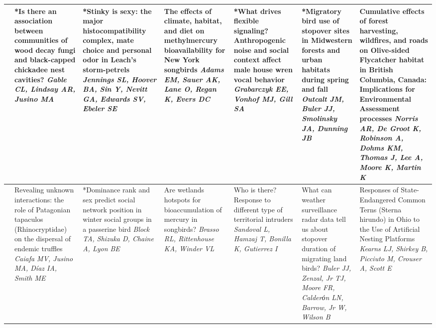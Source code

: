 \begin{tabular}{|x{0.75cm}|a{2.25cm}|x{2.25cm}|x{2.25cm}|x{2.25cm}|x{2.25cm}|x{2.25cm}|}
&*Is there an association between communities of wood decay fungi and black-capped chickadee nest cavities? \newline \newline \textit{Gable CL, Lindsay AR, Jusino MA} & *Stinky is sexy: the major histocompatibility complex, mate choice and personal odor in Leach’s storm-petrels \newline \newline \textit{Jennings SL, Hoover BA, Sin Y, Nevitt GA, Edwards SV, Ebeler SE} & The effects of climate, habitat, and diet on methylmercury bioavailability for New York songbirds \newline \newline \textit{Adams EM, Sauer AK, Lane O, Regan K, Evers DC} & *What drives flexible signaling? Anthropogenic noise and social context affect male house wren vocal behavior \newline \newline \textit{Grabarczyk EE, Vonhof MJ, Gill SA} & *Migratory bird use of stopover sites in Midwestern forests and urban habitats during spring and fall \newline \newline \textit{Outcalt JM, Buler JJ, Smolinsky JA, Dunning JB} & Cumulative effects of forest harvesting, wildfires, and roads on Olive-sided Flycatcher habitat in British Columbia, Canada: Implications for Environmental Assessment processes \newline \newline \textit{Norris AR, De Groot K, Robinson A, Dohms KM, Thomas J, Lee A, Moore K, Martin K}\\
\hline
{}&Revealing unknown interactions: the role of Patagonian tapaculos (Rhinocryptidae) on the dispersal of endemic truffles \newline \newline \textit{Caiafa MV, Jusino MA, D\'{i}az IA, Smith ME} & *Dominance rank and sex predict social network position in winter social groups in a passerine bird \newline \newline \textit{Block TA, Shizuka D, Chaine A, Lyon BE} & Are wetlands hotspots for bioaccumulation of mercury in songbirds? \newline \newline \textit{Brasso RL, Rittenhouse KA, Winder VL} & Who is there? Response to different type of territorial intruders \newline \newline \textit{Sandoval L, Hamzaj T, Bonilla K, Gutierrez I} & What can weather surveillance radar data tell us about stopover duration of migrating land birds? \newline \newline \textit{Buler JJ, Zenzal, Jr TJ, Moore FR, Calderόn LN, Barrow, Jr W, Wilson B} & Responses of State-Endangered Common Terns (Sterna hirundo) in Ohio to the Use of Artificial Nesting Platforms \newline \newline \textit{Kearns LJ, Shirkey B, Picciuto M, Crouser A, Scott E}\\

\end{tabular}
